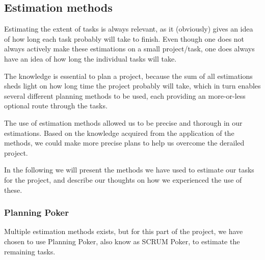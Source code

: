 \subsection{Estimation methods}
Estimating the extent of tasks is always relevant, as it (obviously) gives an idea of how long each task probably will take to finish. Even though one does not always actively make these estimations on a small project/task, one does always have an idea of how long the individual tasks will take.

The knowledge is essential to plan a project, because the sum of all estimations sheds light on how long time the project probably will take, which in turn enables several different planning methods to be used, each providing an more-or-less optional route through the tasks.

The use of estimation methods allowed us to be precise and thorough in our estimations. Based on the knowledge acquired from the application of the methods, we could make more precise plans to help us overcome the derailed project.

In the following we will present the methods we have used to estimate our tasks for the project, and describe our thoughts on how we experienced the use of these.

\subsubsection{Planning Poker}
Multiple estimation methods exists, but for this part of the project, we have chosen to use Planning Poker, also know as SCRUM Poker, to estimate the remaining tasks.

